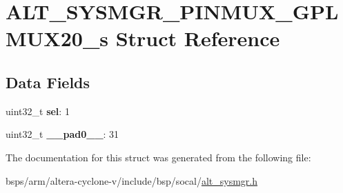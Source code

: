 \hypertarget{structALT__SYSMGR__PINMUX__GPLMUX20__s}{}\section{A\+L\+T\+\_\+\+S\+Y\+S\+M\+G\+R\+\_\+\+P\+I\+N\+M\+U\+X\+\_\+\+G\+P\+L\+M\+U\+X20\+\_\+s Struct Reference}
\label{structALT__SYSMGR__PINMUX__GPLMUX20__s}
\subsection*{Data Fields}
\begin{DoxyCompactItemize}
\item 
\mbox{\label{structALT__SYSMGR__PINMUX__GPLMUX20__s_ae19d08457b551c1212a504d5a69ea99f}} 
uint32\+\_\+t {\bfseries sel}\+: 1
\item 
\mbox{\label{structALT__SYSMGR__PINMUX__GPLMUX20__s_a3dd8aff898007d87e92d413a5d243458}} 
uint32\+\_\+t {\bfseries \+\_\+\+\_\+pad0\+\_\+\+\_\+}\+: 31
\end{DoxyCompactItemize}


The documentation for this struct was generated from the following file\+:\begin{DoxyCompactItemize}
\item 
bsps/arm/altera-\/cyclone-\/v/include/bsp/socal/\mbox{\hyperlink{alt__sysmgr_8h}{alt\+\_\+sysmgr.\+h}}\end{DoxyCompactItemize}
